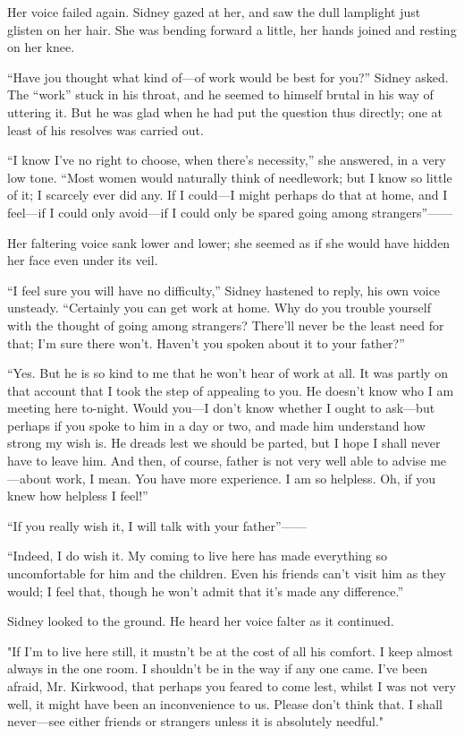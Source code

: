 Her voice failed again. Sidney gazed at her, and saw the dull lamplight
just glisten on her hair. She was bending forward a little, her hands
joined and resting on her knee.

{\protect\hypertarget{81}{}{}}``Have jou thought what kind of---of work
would be best for you?'' Sidney asked. The ``work'' stuck in his throat,
and he seemed to himself brutal in his way of uttering it. But he was
glad when he had put the question thus directly; one at least of his
resolves was carried out.

``I know I've no right to choose, when there's necessity,'' she
answered, in a very low tone. ``Most women would naturally think of
needlework; but I know so little of it; I scarcely ever did any. If I
could---I might perhaps do that at home, and I feel---if I could only
avoid---if I could only be spared going among strangers''{{------}}

Her faltering voice sank lower and lower; she seemed as if she would
have hidden her face even under its veil.

``I feel sure you will have no difficulty,'' Sidney hastened to reply,
his own voice unsteady. ``Certainly you can get work at home. Why do you
trouble yourself with the thought of going among strangers? There'll
never be the least need for that; I'm sure there won't. Haven't you
spoken about it to your father?''

{\protect\hypertarget{82}{}{}}``Yes. But he is so kind to me that he
won't hear of work at all. It was partly on that account that I took the
step of appealing to you. He doesn't know who I am meeting here
to-night. Would you---I don't know whether I ought to ask---but perhaps
if you spoke to him in a day or two, and made him understand how strong
my wish is. He dreads lest we should be parted, but I hope I shall never
have to leave him. And then, of course, father is not very well able to
advise me---about work, I mean. You have more experience. I am so
helpless. Oh, if you knew how helpless I feel!''

``If you really wish it, I will talk with your father''{{------}}

``Indeed, I do wish it. My coming to live here has made everything so
uncomfortable for him and the children. Even his friends can't visit him
as they would; I feel that, though he won't admit that it's made any
difference.''

Sidney looked to the ground. He heard her voice falter as it continued.

"If I'm to live here still, it mustn't be at the cost of all his
comfort. I keep almost {\protect\hypertarget{83}{}{}} always in the one
room. I shouldn't be in the way if any one came. I've been afraid, Mr.
Kirkwood, that perhaps you feared to come lest, whilst I was not very
well, it might have been an inconvenience to us. Please don't think
that. I shall never---see either friends or strangers unless it is
absolutely needful."

